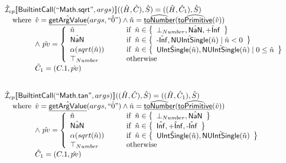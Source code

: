 \documentclass{article}
\newcommand{\SF}[1]{\mbox{\textsf{#1}}}
\newcommand{\wherec}[1]{{\rm where}\begin{array}[t]{l}#1\end{array}}
\newcommand{\ifc}[1]{{\rm if}\begin{array}[t]{l}#1\end{array}}
\newcommand{\owc}{{\rm otherwise}}
\newcommand{\aI}{\hat{\mathcal{I}}}
\newcommand{\set}[1]{\left\{\begin{array}{l}#1\end{array}\right\}}
\newcommand{\lbr}{\llbracket}
\newcommand{\rbr}{\rrbracket}
\newcommand{\hf}[1]{\underline{\sf #1}}
\newcommand{\ahf}[1]{\widehat{\underline{\sf #1}}}
\begin{document}
\[\begin{array}{l}
\aI _{cp}\lbr \SF{BuiltintCall}(``\SF{Math.sqrt}",args)\rbr((\hat{H},\hat{C}), \hat{S})
  = ((\hat{H}, \hat{C}_1), \hat{S})\\
\quad\wherec{
  \hat{v}=\hat{\hf{getArgValue}}(args, \hat{``0"}) \land \hat{n}=\ahf{toNumber}(\ahf{toPrimitive}(\hat{v}))\\
  \land\ \hat{pv}   = 
  \left\{
    \begin{array}{l@{\quad\quad\quad}l}
      \hat{n} & \ifc{\hat{n} \in \set{\bot_{Number}, \hat{\SF{NaN}}, \hat{\SF{+Inf}}}}\\
      \hat{\SF{NaN}} & \ifc{\hat{n} \in \set{\hat{\SF{-Inf}}, \hat{\SF{NUIntSingle}}(\hat{n}) \mid \hat{n}<0}}\\
      \alpha(sqrt(\hat{n})) & \ifc{\hat{n} \in \set{\hat{\SF{UIntSingle}}(\hat{n}), \hat{\SF{NUIntSingle}}(\hat{n}) \mid 0\leq\hat{n}}}\\
      \top_{Number} & \owc\\
    \end{array}
  \right.\\
  \hat{C}_1 = (C.1, \hat{pv})
  }\\
\\\\



\aI _{cp}\lbr \SF{BuiltintCall}(``\SF{Math.tan}",args)\rbr((\hat{H},\hat{C}), \hat{S})
  = ((\hat{H}, \hat{C}_1), \hat{S})\\
\quad\wherec{
  \hat{v}=\hat{\hf{getArgValue}}(args, \hat{``0"}) \land \hat{n}=\ahf{toNumber}(\ahf{toPrimitive}(\hat{v}))\\
  \land\ \hat{pv}   = 
  \left\{
    \begin{array}{l@{\quad\quad\quad}l}
      \hat{n} & \ifc{\hat{n} \in \set{\bot_{Number}, \hat{\SF{NaN}}}}\\
      \hat{\SF{NaN}} & \ifc{\hat{n} \in \set{\hat{\SF{Inf}}, \hat{\SF{+Inf}}, \hat{\SF{-Inf}}}}\\
      \alpha(sqrt(\hat{n})) & \ifc{\hat{n} \in \set{\hat{\SF{UIntSingle}}(\hat{n}), \hat{\SF{NUIntSingle}}(\hat{n})}}\\
      \top_{Number} & \owc\\
    \end{array}
  \right.\\
  \hat{C}_1 = (C.1, \hat{pv})
  }\\
\\\\


\end{array}
\]
\end{document}
